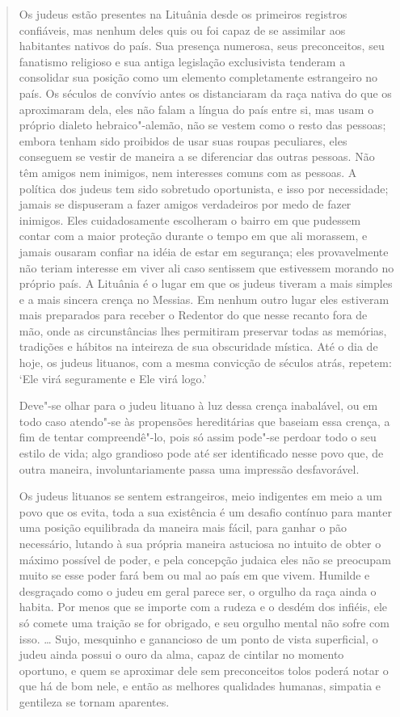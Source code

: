 \begin{quote}
Os judeus estão presentes na Lituânia desde os primeiros registros
confiáveis, mas nenhum deles quis ou foi capaz de se assimilar aos
habitantes nativos do país. Sua presença numerosa, seus preconceitos,
seu fanatismo religioso e sua antiga legislação exclusivista tenderam a
consolidar sua posição como um elemento completamente estrangeiro no
país. Os séculos de convívio antes os distanciaram da raça nativa do que
os aproximaram dela, eles não falam a língua do país entre si, mas usam
o próprio dialeto hebraico"-alemão, não se vestem como o resto das
pessoas; embora tenham sido proibidos de usar suas roupas peculiares,
eles conseguem se vestir de maneira a se diferenciar das outras pessoas.
Não têm amigos nem inimigos, nem interesses comuns com as pessoas. A
política dos judeus tem sido sobretudo oportunista, e isso por
necessidade; jamais se dispuseram a fazer amigos verdadeiros por medo de
fazer inimigos. Eles cuidadosamente escolheram o bairro em que pudessem
contar com a maior proteção durante o tempo em que ali morassem, e
jamais ousaram confiar na idéia de estar em segurança; eles
provavelmente não teriam interesse em viver ali caso sentissem que
estivessem morando no próprio país. A Lituânia é o lugar em que os
judeus tiveram a mais simples e a mais sincera crença no Messias. Em
nenhum outro lugar eles estiveram mais preparados para receber o
Redentor do que nesse recanto fora de mão, onde as circunstâncias lhes
permitiram preservar todas as memórias, tradições e hábitos na inteireza
de sua obscuridade mística. Até o dia de hoje, os judeus lituanos, com a
mesma convicção de séculos atrás, repetem: `Ele virá seguramente e Ele
virá logo.'

Deve"-se olhar para o judeu lituano à luz dessa crença inabalável, ou em
todo caso atendo"-se às propensões hereditárias que baseiam essa crença,
a fim de tentar compreendê"-lo, pois só assim pode"-se perdoar todo o seu
estilo de vida; algo grandioso pode até ser identificado nesse povo que,
de outra maneira, involuntariamente passa uma impressão desfavorável.

Os judeus lituanos se sentem estrangeiros, meio indigentes em meio a um
povo que os evita, toda a sua existência é um desafio contínuo para
manter uma posição equilibrada da maneira mais fácil, para ganhar o pão
necessário, lutando à sua própria maneira astuciosa no intuito de obter
o máximo possível de poder, e pela concepção judaica eles não se
preocupam muito se esse poder fará bem ou mal ao país em que vivem.
Humilde e desgraçado como o judeu em geral parece ser, o orgulho da raça
ainda o habita. Por menos que se importe com a rudeza e o desdém dos
infiéis, ele só comete uma traição se for obrigado, e seu orgulho mental
não sofre com isso. \ldots{} Sujo, mesquinho e ganancioso de um ponto de
vista superficial, o judeu ainda possui o ouro da alma, capaz de
cintilar no momento oportuno, e quem se aproximar dele sem preconceitos
tolos poderá notar o que há de bom nele, e então as melhores qualidades
humanas, simpatia e gentileza se tornam aparentes.


\end{quote}
